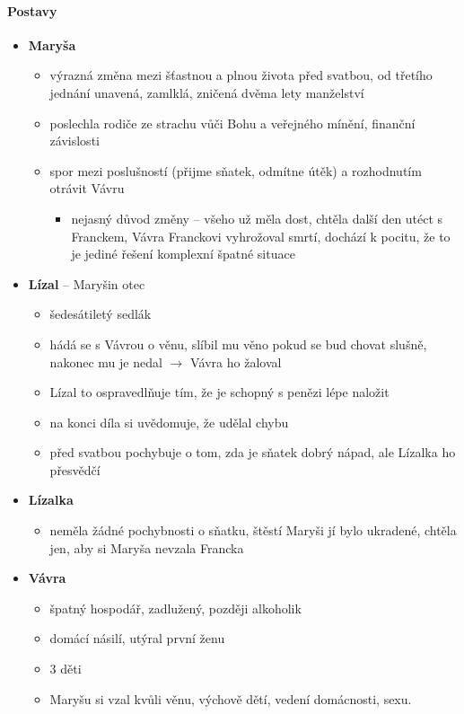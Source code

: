 \documentclass[10pt,a4paper]{article}
\newcommand{\ra}{$\rightarrow$ }
\begin{document}
\paragraph{Postavy}
\begin{itemize}
\item \textbf{Maryša}
	\begin{itemize}
	\item výrazná změna mezi šťastnou a plnou života před svatbou, od třetího jednání unavená, zamlklá, zničená dvěma lety manželství
	\item poslechla rodiče ze strachu vůči Bohu a veřejného mínění, finanční závislosti
	\item spor mezi poslušností (přijme sňatek, odmítne útěk) a rozhodnutím otrávit Vávru
		\begin{itemize}
		\item nejasný důvod změny -- všeho už měla dost, chtěla další den utéct s Franckem, Vávra Franckovi vyhrožoval smrtí, dochází k pocitu, že to je jediné řešení komplexní špatné situace
		\end{itemize}
	\end{itemize}
\item \textbf{Lízal} -- Maryšin otec
	\begin{itemize}
	\item šedesátiletý sedlák
	\item hádá se s Vávrou o věnu, slíbil mu věno pokud se bud chovat slušně, nakonec mu je nedal \ra Vávra ho žaloval
	\item Lízal to ospravedlňuje tím, že je schopný s penězi lépe naložit
	\item na konci díla si uvědomuje, že udělal chybu
	\item před svatbou pochybuje o tom, zda je sňatek dobrý nápad, ale Lízalka ho přesvědčí
	\end{itemize}
\item \textbf{Lízalka}
	\begin{itemize}
	\item neměla žádné pochybnosti o sňatku, štěstí Maryši jí bylo ukradené, chtěla jen, aby si Maryša nevzala Francka
	\end{itemize}
\item \textbf{Vávra}
	\begin{itemize}
	\item špatný hospodář, zadlužený, později alkoholik
	\item domácí násilí, utýral první ženu
	\item 3 děti
	\item Maryšu si vzal kvůli věnu, výchově dětí, vedení domácnosti, sexu.

\end{itemize}
\end{itemize}
\end{document}
